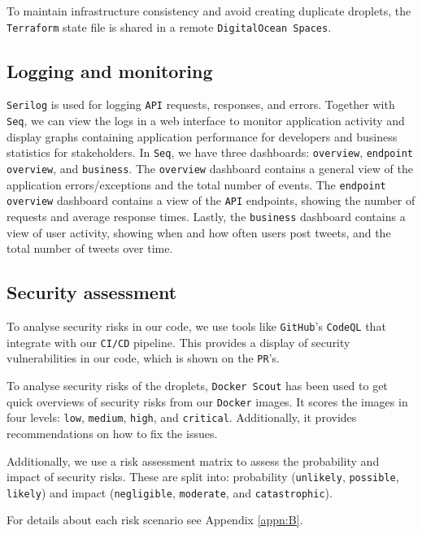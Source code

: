 To maintain infrastructure consistency and avoid creating duplicate droplets,
the \texttt{Terraform} state file is shared in a remote \texttt{DigitalOcean Spaces}.

\subsection{Logging and monitoring}
\texttt{Serilog} is used for logging \texttt{API} requests, responses, and errors.
Together with \texttt{Seq}, we can view the logs in a web interface to monitor 
application activity and display graphs containing application performance 
for developers and business statistics for stakeholders.
In \texttt{Seq}, we have three dashboards: \texttt{overview}, \texttt{endpoint overview}, and \texttt{business}.
The \texttt{overview} dashboard contains a general view of the application 
errors/exceptions and the total number of events.
The \texttt{endpoint overview} dashboard contains a view of the \texttt{API} endpoints,
showing the number of requests and average response times.
Lastly, the \texttt{business} dashboard contains a view of user activity,
showing when and how often users post tweets, and the total number of tweets over time.


\subsection{Security assessment}
To analyse security risks in our code, we use tools like \texttt{GitHub}'s \texttt{CodeQL}\cite{codeql} that 
integrate with our \texttt{CI/CD} pipeline.
This provides a display of security vulnerabilities in our code,
which is shown on the \texttt{PR}'s.

To analyse security risks of the droplets, \texttt{Docker Scout} has been used to get
quick overviews of security risks from our \texttt{Docker} images.
It scores the images in four levels: \texttt{low}, \texttt{medium}, \texttt{high}, and \texttt{critical}.
Additionally, it provides recommendations on how to fix the issues.

Additionally, we use a risk assessment matrix to assess the probability and impact of security risks. 
These are split into: probability (\texttt{unlikely}, \texttt{possible}, \texttt{likely}) and impact (\texttt{negligible}, \texttt{moderate}, and \texttt{catastrophic}).

For details about each risk scenario see Appendix \ref{appn:B}.

